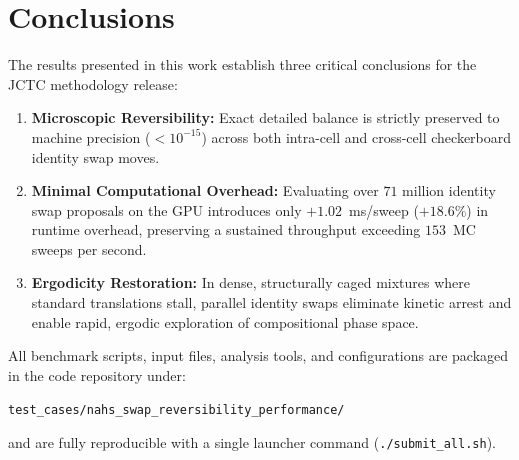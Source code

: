 \documentclass[11pt,a4paper]{article}
\begin{document}
\section{Conclusions}

The results presented in this work establish three critical conclusions for the JCTC methodology release:
\begin{enumerate}
    \item \textbf{Microscopic Reversibility:} Exact detailed balance is strictly preserved to machine precision ($< 10^{-15}$) across both intra-cell and cross-cell checkerboard identity swap moves.
    \item \textbf{Minimal Computational Overhead:} Evaluating over $71$ million identity swap proposals on the GPU introduces only $+1.02$~ms/sweep ($+18.6\%$) in runtime overhead, preserving a sustained throughput exceeding $153$~MC sweeps per second.
    \item \textbf{Ergodicity Restoration:} In dense, structurally caged mixtures where standard translations stall, parallel identity swaps eliminate kinetic arrest and enable rapid, ergodic exploration of compositional phase space.
\end{enumerate}

All benchmark scripts, input files, analysis tools, and configurations are packaged in the code repository under:
\begin{center}
\texttt{test\_cases/nahs\_swap\_reversibility\_performance/}
\end{center}
and are fully reproducible with a single launcher command (\texttt{./submit\_all.sh}).
\end{document}
